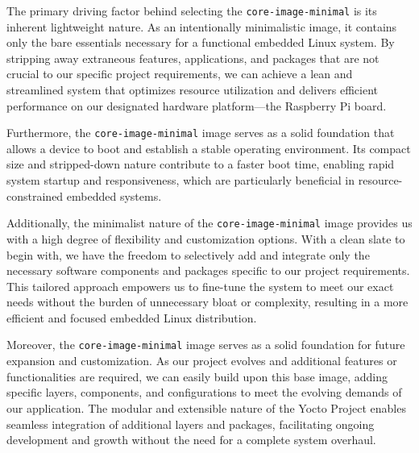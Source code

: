 \documentclass[
12pt,
oneside, 
onehalfspacing, 
nolistspacing, 
parskip, 
chapterinoneline, 
]{AASTCOMPUTER}
\begin{document}
The primary driving factor behind selecting the \texttt{core-image-minimal} is its inherent lightweight nature. As an intentionally minimalistic image, it contains only the bare essentials necessary for a functional embedded Linux system. By stripping away extraneous features, applications, and packages that are not crucial to our specific project requirements, we can achieve a lean and streamlined system that optimizes resource utilization and delivers efficient performance on our designated hardware platform---the Raspberry Pi board.

Furthermore, the \texttt{core-image-minimal} image serves as a solid foundation that allows a device to boot and establish a stable operating environment. Its compact size and stripped-down nature contribute to a faster boot time, enabling rapid system startup and responsiveness, which are particularly beneficial in resource-constrained embedded systems.

Additionally, the minimalist nature of the \texttt{core-image-minimal} image provides us with a high degree of flexibility and customization options. With a clean slate to begin with, we have the freedom to selectively add and integrate only the necessary software components and packages specific to our project requirements. This tailored approach empowers us to fine-tune the system to meet our exact needs without the burden of unnecessary bloat or complexity, resulting in a more efficient and focused embedded Linux distribution.

Moreover, the \texttt{core-image-minimal} image serves as a solid foundation for future expansion and customization. As our project evolves and additional features or functionalities are required, we can easily build upon this base image, adding specific layers, components, and configurations to meet the evolving demands of our application. The modular and extensible nature of the Yocto Project enables seamless integration of additional layers and packages, facilitating ongoing development and growth without the need for a complete system overhaul.
\end{document}
